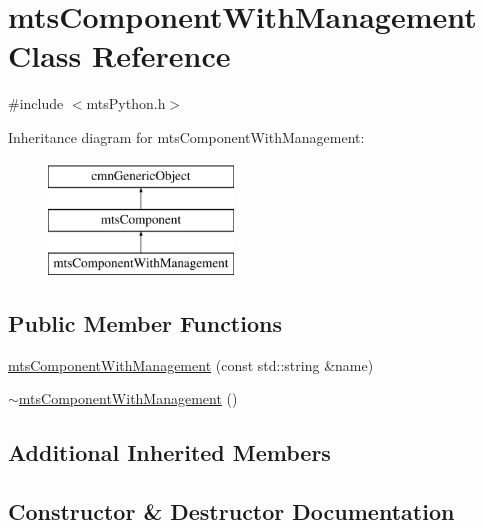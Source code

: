 \hypertarget{classmts_component_with_management}{}\section{mts\+Component\+With\+Management Class Reference}
\label{classmts_component_with_management}


{\ttfamily \#include $<$mts\+Python.\+h$>$}

Inheritance diagram for mts\+Component\+With\+Management\+:\begin{figure}[H]
\begin{center}
\leavevmode
\includegraphics[height=3.000000cm]{db/d6e/classmts_component_with_management}
\end{center}
\end{figure}
\subsection*{Public Member Functions}
\begin{DoxyCompactItemize}
\item 
\hyperlink{classmts_component_with_management_a42fe6cff7ac91bafbbf51390093dc1ef}{mts\+Component\+With\+Management} (const std\+::string \&name)
\item 
\hyperlink{classmts_component_with_management_a4a9a3a8ed5c4c098cac90c5403c86672}{$\sim$mts\+Component\+With\+Management} ()
\end{DoxyCompactItemize}
\subsection*{Additional Inherited Members}


\subsection{Constructor \& Destructor Documentation}
\hypertarget{classmts_component_with_management_a42fe6cff7ac91bafbbf51390093dc1ef}{}

